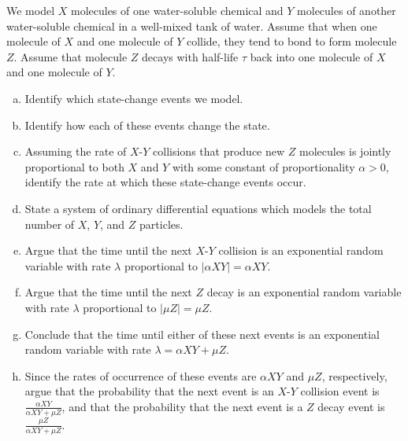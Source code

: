 \begin{exercises}
\item \label{ex:hw_molecule_collision}
We model $X$ molecules of one water-soluble chemical and $Y$ molecules of another water-soluble chemical in a well-mixed tank of water. Assume that when one molecule of $X$ and one molecule of $Y$ collide, they tend to bond to form molecule $Z$. Assume that molecule $Z$ decays with half-life $\tau$ back into one molecule of $X$ and one molecule of $Y$.
\begin{enumerate}[(a)]
\item Identify which state-change events we model.
\item Identify how each of these events change the state.
\item Assuming the rate of $X$-$Y$ collisions that produce new $Z$ molecules is jointly proportional to both $X$ and $Y$ with some constant of proportionality $\alpha > 0$, identify the rate at which these state-change events occur.
\item State a system of ordinary differential equations which models the total number of $X$, $Y$, and $Z$ particles.
\item Argue that the time until the next $X$-$Y$ collision is an exponential random variable with rate $\lambda$ proportional to $\left|\alpha X Y\right| = \alpha XY$.
\item Argue that the time until the next $Z$ decay is an exponential random variable with rate $\lambda$ proportional to $\left|\mu Z\right| = \mu Z$.
\item Conclude that the time until either of these next events is an exponential random variable with rate $\lambda = \alpha X Y + \mu Z$.
\item Since the rates of occurrence of these events are $\alpha X Y$ and $\mu Z$, respectively, argue that the probability that the next event is an $X$-$Y$ collision event is $\frac{\alpha X Y}{\alpha X Y + \mu Z}$, and that the probability that the next event is a $Z$ decay event is $\frac{\mu Z}{\alpha X Y + \mu Z}$.
\end{enumerate}



\item \label{ex:hw_bound_ext_time}


\end{exercises}
